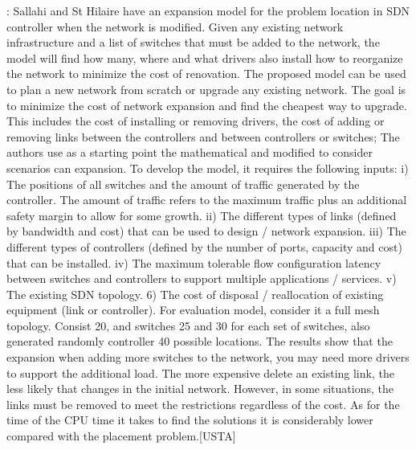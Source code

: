 \documentclass[a4paper,10pt]{article}
\begin{document}
\cite{SaHi17}: Sallahi and St Hilaire have an expansion model for the problem location in SDN controller when the network is modified. Given any existing network infrastructure and a list of switches that must be added to the network, the model will find how many, where and what drivers also install how to reorganize the network to minimize the cost of renovation. The proposed model can be used to plan a new network from scratch or upgrade any existing network. The goal is to minimize the cost of network expansion and find the cheapest way to upgrade. This includes the cost of installing or removing drivers, the cost of adding or removing links between the controllers and between controllers or switches;
The authors use as a starting point the mathematical and modified to consider scenarios can expansion. To develop the model, it requires the following inputs: i) The positions of all switches and the amount of traffic generated by the controller. The amount of traffic refers to the maximum traffic plus an additional safety margin to allow for some growth. ii) The different types of links (defined by bandwidth and cost) that can be used to design / network expansion. iii) The different types of controllers (defined by the number of ports, capacity and cost) that can be installed. iv) The maximum tolerable flow configuration latency between switches and controllers to support multiple applications / services. v) The existing SDN topology.
6) The cost of disposal / reallocation of existing equipment (link or controller).
For evaluation model, consider it a full mesh topology. Consist 20, and switches 25 and 30 for each set of switches, also generated randomly controller 40 possible locations. The results show that the expansion when adding more switches to the network, you may need more drivers to support the additional load. The more expensive delete an existing link, the less likely that changes in the initial network. However, in some situations, the links must be removed to meet the restrictions regardless of the cost. As for the time of the CPU time it takes to find the solutions it is considerably lower compared with the placement problem.[USTA]
\end{document}

